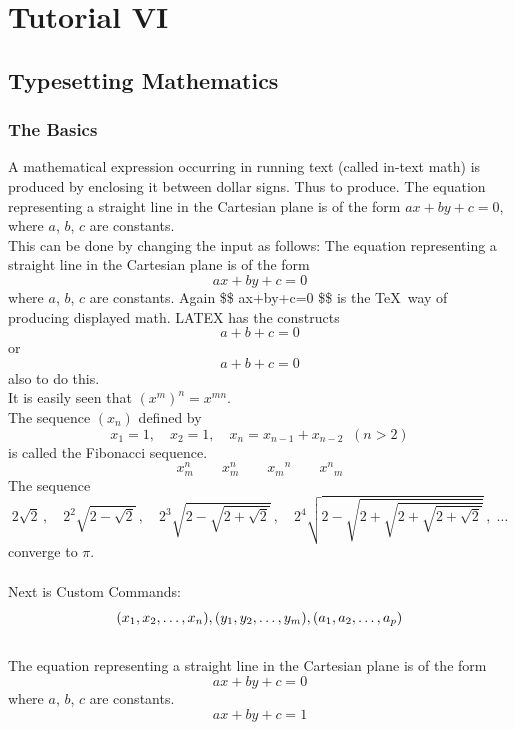 \documentclass{article}
\theoremstyle{definition}
\theoremstyle{remark}
\theoremstyle{plain}
\numberwithin{equation}{subsection}
\begin{document}
{\section{Tutorial VI}
\subsection{Typesetting Mathematics}
\subsubsection{The Basics}
A mathematical expression occurring in running text (called in-text math) is produced by enclosing it between dollar signs. Thus to produce. The equation representing a straight line in the Cartesian plane is of the form $ax+by+c=0$, where $a$, $b$, $c$ are constants.\\
This can be done by changing the input as follows:
The equation representing a straight line in the Cartesian plane is
of the form
$$
ax+by+c=0
$$
where $a$, $b$, $c$ are constants.
Again \$\$ ax+by+c=0 \$\$ is the \TeX \ way of producing displayed math. LATEX has the constructs
\[ a+b+c=0\] or \begin{displaymath} a+b+c = 0 \end{displaymath} also to do this.\\
It is easily seen that $(x^m)^n=x^{mn}$.\\
The sequence $(x_n)$ defined by
$$
x_1=1,\quad x_2=1,\quad x_n=x_{n-1}+x_{n-2}\;\;(n>2)
$$
is called the Fibonacci sequence.
$$
x_m^n\qquad x^n_m\qquad {x_m}^n\qquad {x^n}_m
$$
The sequence
$$
2\sqrt{2}\,,\quad 2^2\sqrt{2-\sqrt{2}}\,,\quad 2^3
\sqrt{2-\sqrt{2+\sqrt{2}}}\,,\quad 2^4\sqrt{2-
	\sqrt{2+\sqrt{2+\sqrt{2+\sqrt{2}}}}}\,,\;\ldots
$$
converge to $\pi$.\\
\\Next is Custom Commands:\\
\newcommand{\vect}[2]{(#1_1,#1_2,\dots,#1_#2)}
\begin{displaymath} \vect{x}{n},\\ \vect{y}{m},\\ \vect{a}{p} \end{displaymath}\\
The equation representing a straight line in the Cartesian plane is
of the form
\begin{equation}
	ax+by+c=0\tag{1-1}
\end{equation}
where $a$, $b$, $c$ are constants.
\begin{equation}
    ax+by+c=1

\end{equation}}
\end{document}
